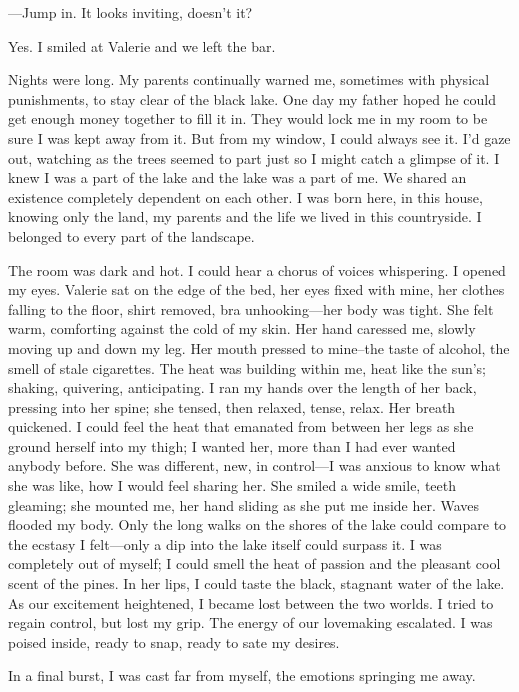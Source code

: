 ---Jump in. It looks inviting, doesn't it?

Yes. I smiled at Valerie and we left the bar.

Nights were long. My parents continually warned me, sometimes with
physical punishments, to stay clear of the black lake. One day my father
hoped he could get enough money together to fill it in. They would lock
me in my room to be sure I was kept away from it. But from my window, I
could always see it. I'd gaze out, watching as the trees seemed to part
just so I might catch a glimpse of it. I knew I was a part of the lake
and the lake was a part of me. We shared an existence completely
dependent on each other. I was born here, in this house, knowing only
the land, my parents and the life we lived in this countryside. I
belonged to every part of the landscape.

The room was dark and hot. I could hear a chorus of voices whispering. I
opened my eyes. Valerie sat on the edge of the bed, her eyes fixed with
mine, her clothes falling to the floor, shirt removed, bra
unhooking---her body was tight. She felt warm, comforting against the
cold of my skin. Her hand caressed me, slowly moving up and down my leg.
Her mouth pressed to mine--the taste of alcohol, the smell of stale
cigarettes. The heat was building within me, heat like the sun's;
shaking, quivering, anticipating. I ran my hands over the length of her
back, pressing into her spine; she tensed, then relaxed, tense, relax.
Her breath quickened. I could feel the heat that emanated from between
her legs as she ground herself into my thigh; I wanted her, more than I
had ever wanted anybody before. She was different, new, in control---I
was anxious to know what she was like, how I would feel sharing her. She
smiled a wide smile, teeth gleaming; she mounted me, her hand sliding as
she put me inside her. Waves flooded my body. Only the long walks on the
shores of the lake could compare to the ecstasy I felt---only a dip into
the lake itself could surpass it. I was completely out of myself; I
could smell the heat of passion and the pleasant cool scent of the
pines. In her lips, I could taste the black, stagnant water of the lake.
As our excitement heightened, I became lost between the two worlds. I
tried to regain control, but lost my grip. The energy of our lovemaking
escalated. I was poised inside, ready to snap, ready to sate my desires.

In a final burst, I was cast far from myself, the emotions springing me
away.


